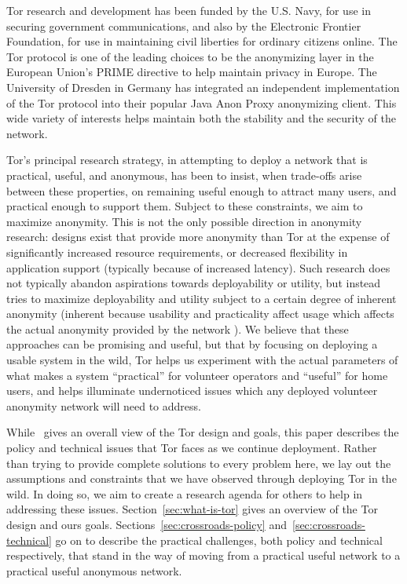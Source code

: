 \documentclass{llncs}
\begin{document}
Tor research and development has been funded by the U.S. Navy, for use
in securing government
communications, and also by the Electronic Frontier Foundation, for use
in maintaining civil liberties for ordinary citizens online. The Tor
protocol is one of the leading choices
to be the anonymizing layer in the European Union's PRIME directive to
help maintain privacy in Europe. The University of Dresden in Germany
has integrated an independent implementation of the Tor protocol into
their popular Java Anon Proxy anonymizing client. This wide variety of
interests helps maintain both the stability and the security of the
network.

Tor's principal research strategy, in attempting to deploy a network that is
practical, useful, and anonymous, has been to insist, when trade-offs arise
between these properties, on remaining useful enough to attract many users,
and practical enough to support them.  Subject to these
constraints, we aim to maximize anonymity.  This is not the only possible
direction in anonymity research: designs exist that provide more anonymity
than Tor at the expense of significantly increased resource requirements, or
decreased flexibility in application support (typically because of increased
latency).  Such research does not typically abandon aspirations towards
deployability or utility, but instead tries to maximize deployability and
utility subject to a certain degree of inherent anonymity (inherent because
usability and practicality affect usage which affects the actual anonymity
provided by the network \cite{back01,econymics}). We believe that these
approaches can be promising and useful, but that by focusing on deploying a
usable system in the wild, Tor helps us experiment with the actual parameters
of what makes a system ``practical'' for volunteer operators and ``useful''
for home users, and helps illuminate undernoticed issues which any deployed
volunteer anonymity network will need to address. 

While~\cite{tor-design} gives an overall view of the Tor design and goals,
this paper describes the policy and technical issues that Tor faces as
we continue deployment. Rather than trying to provide complete solutions
to every problem here, we lay out the assumptions and constraints
that we have observed through deploying Tor in the wild. In doing so, we
aim to create a research agenda for others to
help in addressing these issues. Section~\ref{sec:what-is-tor} gives an
overview of the Tor
design and ours goals. Sections~\ref{sec:crossroads-policy}
and~\ref{sec:crossroads-technical} go on to describe the practical challenges,
both policy and technical respectively, that stand in the way of moving
from a practical useful network to a practical useful anonymous network.
\end{document}
